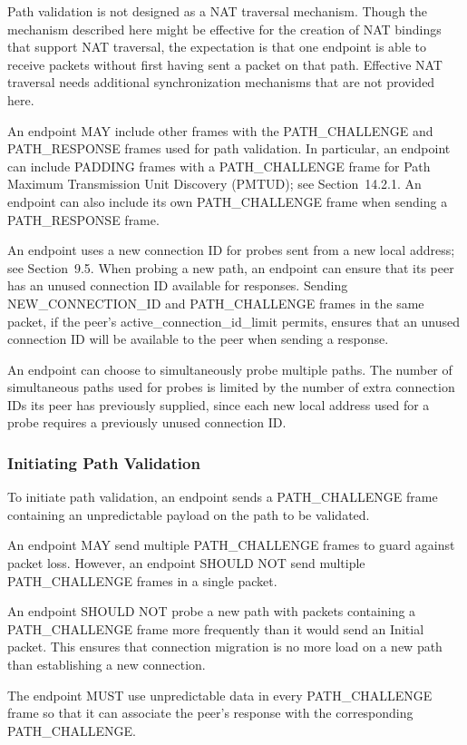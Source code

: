 \documentclass{article}
\begin{document}
Path validation is not designed as a NAT traversal mechanism.  Though the mechanism described here might be effective for the creation of NAT bindings that support NAT traversal, the expectation is that one endpoint is able to receive packets without first having sent a packet on that path.  Effective NAT traversal needs additional synchronization mechanisms that are not provided here.

An endpoint MAY include other frames with the PATH\_CHALLENGE and PATH\_RESPONSE frames used for path validation.  In particular, an endpoint can include PADDING frames with a PATH\_CHALLENGE frame for Path Maximum Transmission Unit Discovery (PMTUD); see Section~14.2.1. An endpoint can also include its own PATH\_CHALLENGE frame when sending a PATH\_RESPONSE frame.

An endpoint uses a new connection ID for probes sent from a new local address; see Section~9.5.  When probing a new path, an endpoint can ensure that its peer has an unused connection ID available for responses.  Sending NEW\_CONNECTION\_ID and PATH\_CHALLENGE frames in the same packet, if the peer's active\_connection\_id\_limit permits, ensures that an unused connection ID will be available to the peer when sending a response.

An endpoint can choose to simultaneously probe multiple paths.  The number of simultaneous paths used for probes is limited by the number of extra connection IDs its peer has previously supplied, since each new local address used for a probe requires a previously unused connection ID.

\subsubsection{Initiating Path Validation}

To initiate path validation, an endpoint sends a PATH\_CHALLENGE frame containing an unpredictable payload on the path to be validated.

An endpoint MAY send multiple PATH\_CHALLENGE frames to guard against packet loss.  However, an endpoint SHOULD NOT send multiple PATH\_CHALLENGE frames in a single packet.

An endpoint SHOULD NOT probe a new path with packets containing a PATH\_CHALLENGE frame more frequently than it would send an Initial packet.  This ensures that connection migration is no more load on a new path than establishing a new connection.

The endpoint MUST use unpredictable data in every PATH\_CHALLENGE frame so that it can associate the peer's response with the corresponding PATH\_CHALLENGE.
\end{document}
